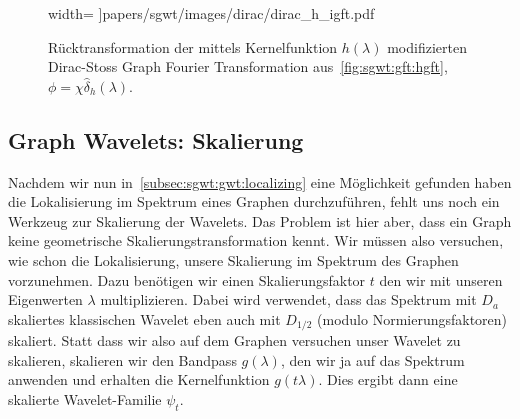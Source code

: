 \begin{figure}
\begin{minipage}[t]{0.49\textwidth}
        width=\textwidth
        ]{papers/sgwt/images/dirac/dirac_h_igft.pdf}
        \vspace{-0pt}
        \caption{R\"ucktransformation der mittels Kernelfunktion $h(\lambda)$ 
        modifizierten Dirac-Stoss Graph Fourier Transformation
        aus~\cref{fig:sgwt:gft:hgft}, $\phi = \chi\hat{\delta}_h(\lambda)$.
        \label{fig:sgwt:gft:ihgft}}
    \end{minipage}
\end{figure}

\subsection{Graph Wavelets: Skalierung\label{subsec:sgwt:gwt:scaling}}

Nachdem wir nun in~\cref{subsec:sgwt:gwt:localizing} eine M\"oglichkeit 
gefunden haben die Lokalisierung im Spektrum eines Graphen durchzuf\"uhren, 
fehlt uns noch ein Werkzeug zur Skalierung der Wavelets. Das Problem ist hier 
aber, dass ein Graph keine geometrische Skalierungstransformation kennt. Wir 
m\"ussen also versuchen, wie schon die Lokalisierung, unsere 
Skalierung im Spektrum des Graphen vorzunehmen. Dazu ben\"otigen wir einen 
Skalierungsfaktor $t$ den wir mit unseren Eigenwerten $\lambda$ multiplizieren.
Dabei wird verwendet, dass das Spektrum mit $D_a$ skaliertes klassischen 
Wavelet eben auch mit $D_{1/2}$ (modulo Normierungsfaktoren) skaliert. Statt 
dass wir also auf dem Graphen versuchen unser Wavelet zu skalieren, skalieren 
wir den Bandpass $g(\lambda)$, den wir ja auf das Spektrum anwenden und 
erhalten die Kernelfunktion $g(t\lambda)$. Dies ergibt dann eine skalierte 
Wavelet-Familie $\psi_t$.

